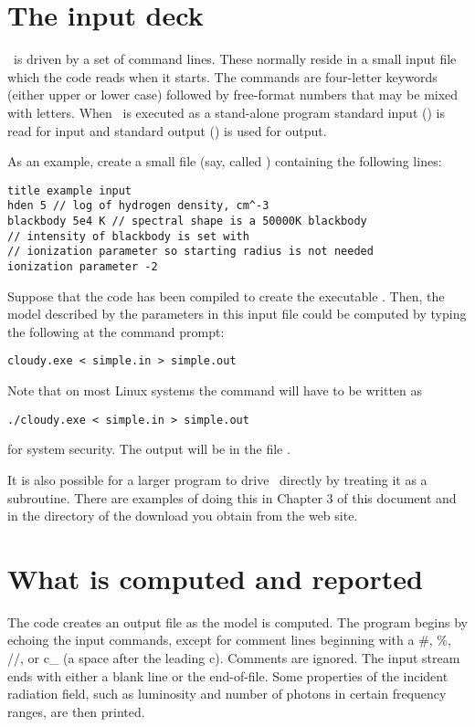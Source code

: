 \section{The input deck}

\noindent \Cloudy\ is driven by a set of command lines.
These normally reside in a small input file which the code reads
when it starts.
The commands are four-letter keywords (either
upper or lower case) followed by free-format numbers that
may be mixed with letters.
When \Cloudy\ is executed as a stand-alone program standard input
() is read for input and standard output () is used for output.

As an example, create a small file (say, called )
containing the following lines:

\begin{verbatim}
title example input
hden 5 // log of hydrogen density, cm^-3
blackbody 5e4 K // spectral shape is a 50000K blackbody
// intensity of blackbody is set with
// ionization parameter so starting radius is not needed
ionization parameter -2
\end{verbatim}
Suppose that the code has been compiled to create the executable .
Then, the model described by the parameters in this input file could be
computed by typing the following at the command prompt:
\begin{verbatim}
cloudy.exe < simple.in > simple.out
\end{verbatim}
Note that on most Linux systems the command will have to be written as
\begin{verbatim}
./cloudy.exe < simple.in > simple.out
\end{verbatim}
for system security.
The output will be in the file .

It is also possible for a larger program to drive \Cloudy\ directly by
treating it as a subroutine. There are examples of doing this in Chapter 3
of this document and in the
 directory of the download you obtain from the web site.

\section{What is computed and reported}

The code creates an output file as the model is computed.
The program begins by echoing the input commands, except for comment
lines beginning with a \#, \%, //, or c\_ (a space after the leading c).
Comments are ignored.  The input stream ends with either a blank line or
the end-of-file.  Some properties of the incident radiation field, such
as luminosity and number of photons in certain frequency ranges, are then
printed.

